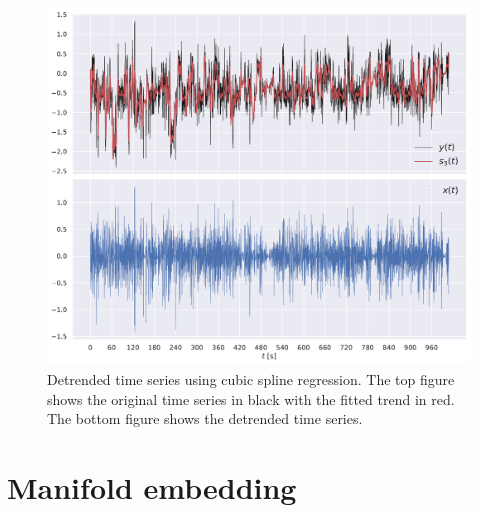 \documentclass[a4paper]{memoir}
\theoremstyle{plain}
\theoremstyle{definition}
\theoremstyle{remark}
\begin{document}
\begin{figure}[tb ]
        \centering
        \includegraphics[width=\linewidth]{./code/figures/detrending_bc.pdf}
        \caption{Detrended time series using cubic spline regression.
        The top figure shows the original time series in black with the fitted trend in red.
The bottom figure shows the detrended time series.}
        \label{fig:detrending_bc}
\end{figure}

\section{Manifold embedding}








\newpage
\printbibliography
\end{document}

